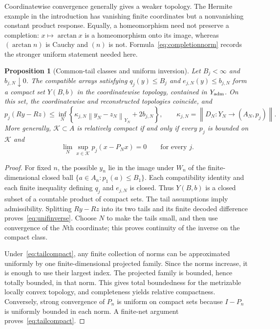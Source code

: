 \documentclass[11pt,a4paper]{amsart}
\numberwithin{equation}{section}
\newtheorem{proposition}[theorem]{Proposition}
\theoremstyle{definition}
\theoremstyle{remark}
\newcommand{\norm}[1]{\left\lVert#1\right\rVert}
\begin{document}
Coordinatewise convergence generally gives a weaker topology. The Hermite example in the introduction has vanishing finite coordinates but a nonvanishing constant product response. Equally, a homeomorphism need not preserve a completion: $x\mapsto\arctan x$ is a homeomorphism onto its image, whereas $(\arctan n)$ is Cauchy and $(n)$ is not. Formula~\eqref{eq:completionnorm} records the stronger uniform statement needed here.

\begin{proposition}[Common-tail classes and uniform inversion]\label{prop:certclass}
Let $B_j<\infty$ and $b_{j,N}\downarrow0$. The compatible arrays satisfying $q_j(y)\le B_j$ and $e_{j,N}(y)\le b_{j,N}$ form a compact set $Y(B,b)$ in the coordinatewise topology, contained in $Y_{\rm adm}$. On this set, the coordinatewise and reconstructed topologies coincide, and
\begin{equation}\label{eq:unifinverse}
 p_j(Ry-Rz)\le\inf_N\left\{
 \kappa_{j,N}\norm{y_N-z_N}_{Y_N}+2b_{j,N}\right\},
 \qquad\kappa_{j,N}=\norm{D_N:Y_N\to(A_N,p_j)}.
\end{equation}
More generally, $\mathcal K\subset A$ is relatively compact if and only if every $p_j$ is bounded on $\mathcal K$ and
\begin{equation}\label{eq:tailcompact}
 \lim_N\sup_{x\in\mathcal K}p_j(x-P_Nx)=0\qquad\text{for every }j.
\end{equation}
\end{proposition}
\begin{proof}
For fixed $n$, the possible $y_n$ lie in the image under $W_n$ of the finite-dimensional closed ball $\{a\in A_n:p_1(a)\le B_1\}$. Each compatibility identity and each finite inequality defining $q_j$ and $e_{j,N}$ is closed. Thus $Y(B,b)$ is a closed subset of a countable product of compact sets. The tail assumptions imply admissibility. Splitting $Ry-Rz$ into its two tails and its finite decoded difference proves~\eqref{eq:unifinverse}. Choose $N$ to make the tails small, and then use convergence of the $N$th coordinate; this proves continuity of the inverse on the compact class.

Under~\eqref{eq:tailcompact}, any finite collection of norms can be approximated uniformly by one finite-dimensional projected family. Since the norms increase, it is enough to use their largest index. The projected family is bounded, hence totally bounded, in that norm. This gives total boundedness for the metrizable locally convex topology, and completeness yields relative compactness. Conversely, strong convergence of $P_n$ is uniform on compact sets because $I-P_n$ is uniformly bounded in each norm. A finite-net argument proves~\eqref{eq:tailcompact}.
\end{proof}
\end{document}
